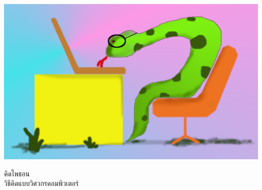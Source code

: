 \begin{latexonly}

\renewcommand{\blankpage}{\thispagestyle{empty} \quad \newpage}



\includegraphics[width=\textwidth]{cover/python1a.pdf}

\thispagestyle{empty}

\begin{flushright}

\begin{spacing}{3}
{\Huge คิดไพธอน}\\
{\huge วิธีคิดแบบวิศวกรคอมพิวเตอร์}
\end{spacing}



\vspace{0.25in}



\thedate


\end{flushright}




\blankpage
\blankpage

\pagebreak
\thispagestyle{empty}

\begin{flushright}
\vspace*{2.0in}


\end{flushright}
\end{latexonly}
